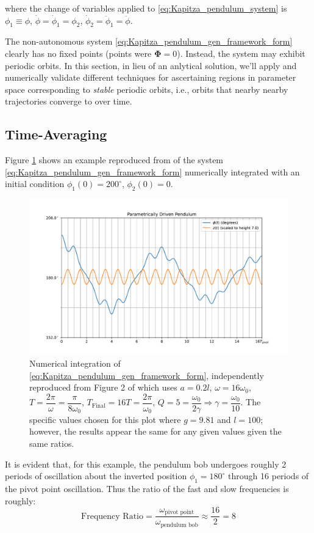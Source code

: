 \documentclass[12pt, letterpaper]{article}
\begin{document}
where the change of variables applied to \ref{eq:Kapitza_pendulum_system} is $\phi_1 \equiv \phi$, $\dot{\phi} = \dot{\phi}_1 = \phi_2$, $\dot{\phi}_2 = \ddot{\phi}_1 = \ddot{\phi}$.
\par The non-autonomous system \ref{eq:Kapitza_pendulum_gen_framework_form} clearly has no fixed points (points were $\bm{\Phi} = 0$). Instead, the system may exhibit periodic orbits. In this section, in lieu of an anlytical solution, we'll apply and numerically validate different techniques for ascertaining regions in parameter space corresponding to \emph{stable} periodic orbits, i.e., orbits that nearby nearby trajectories converge to over time.
\subsection{Time-Averaging} \label{subsec:time_averaging}
Figure \ref{fig:butikov_2017_figure_2} shows an example reproduced from \cite{Butikov2017KapitzaS} of the system \ref{eq:Kapitza_pendulum_gen_framework_form} numerically integrated with an initial condition $\phi_1(0) = 200^\circ$, $\phi_2(0) = 0$. 

\begin{figure}
    \centering
    \includegraphics[width=0.5\linewidth]{ButikovKapitza2017Figure2.pdf}
    \caption{Numerical integration of \ref{eq:Kapitza_pendulum_gen_framework_form}, independently reproduced from Figure 2 of \cite{Butikov2017KapitzaS} which uses $a = 0.2l$, $\omega = 16 \omega_0$, $T = \dfrac{2\pi}{\omega} = \dfrac{\pi}{8\omega_0}$, $T_{\mathrm{Final}} = 16 T = \dfrac{2\pi}{\omega_0}$, $Q = 5 = \dfrac{\omega_0}{2\gamma} \Rightarrow \gamma = \dfrac{\omega_0}{10}$. The specific values chosen for this plot where $g = 9.81$ and $l = 100$; however, the results appear the same for any given values given the same ratios.}
    \label{fig:butikov_2017_figure_2}
\end{figure}

It is evident that, for this example, the pendulum bob undergoes roughly 2 periods of oscillation about the inverted position $\phi_1=180^{\circ}$ through 16 periods of the pivot point oscillation. Thus the ratio of the fast and slow frequencies is roughly:
\begin{equation}
    \text{Frequency Ratio} = \frac{\omega_{\text{pivot point}}}{\omega_{\text{pendulum bob}}} \approx \frac{16}{2} = 8
\end{equation}
\end{document}
